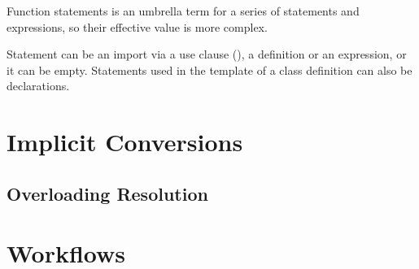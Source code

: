 Function statements is an umbrella term for a series of statements and expressions, so their effective value is more complex. 

Statement can be an import via a use clause (), a definition or an expression, or it can be empty. Statements used in the template of a class definition can also be declarations. 








\section{Implicit Conversions}
\label{sec:implicit-conversions}

\subsection{Overloading Resolution}
\label{sec:overloading-resolution}

\section{Workflows}
\label{sec:workflows}



